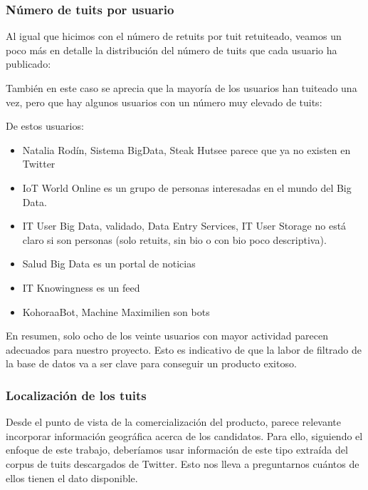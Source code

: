\subsubsection{Número de tuits por usuario}
Al igual que hicimos con el número de retuits por tuit retuiteado, veamos un poco más en detalle
la distribución del número de tuits que cada usuario ha publicado:


También en este caso se aprecia que la mayoría de los usuarios han tuiteado una vez, pero que hay algunos usuarios con un número muy elevado de tuits:


De estos usuarios:
\begin{itemize}
\setlength\itemsep{-0.1cm}
\item Natalia Rodín, Sistema BigData, Steak Hutsee parece que ya no existen en Twitter
\item IoT World Online es un grupo de personas interesadas en el mundo del Big Data.
\item IT User Big Data, validado, Data Entry Services, IT User Storage no está claro si son personas (solo retuits, sin bio o con bio poco descriptiva).
\item Salud Big Data es un portal de noticias
\item IT Knowingness es un feed 
\item KohoraaBot, Machine Maximilien son bots
\end{itemize}

En resumen, solo ocho de los veinte usuarios con mayor actividad parecen adecuados para
nuestro proyecto. Esto es indicativo de que la labor de filtrado de la base de datos
va a ser clave para conseguir un producto exitoso.

\subsubsection{Localización de los tuits}
Desde el punto de vista de la comercialización del producto, parece relevante incorporar información geográfica acerca de los candidatos. Para ello, siguiendo el enfoque de este trabajo, deberíamos usar información de este tipo extraída del corpus de tuits descargados de Twitter. Esto nos lleva a preguntarnos cuántos de ellos tienen el dato disponible. 

